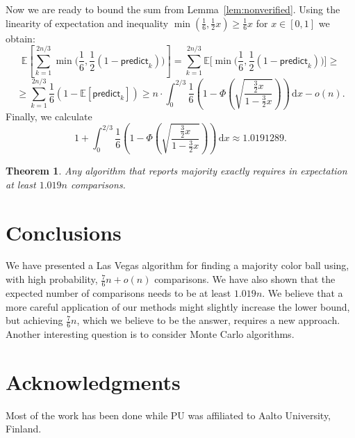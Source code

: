 \documentclass{article}[11pt,a4paper]
\newtheorem{theorem}[definition]{Theorem}
\newcommand{\predict}{\mathsf{predict}}
\newcommand{\E}{\mathbb{E}}
\begin{document}
Now we are ready to bound the sum from Lemma~\ref{lem:nonverified}. Using the linearity
of expectation and inequality $\min(\frac{1}{6},\frac{1}{2}x) \geq \frac{1}{6}x$ for $x\in[0,1]$ we obtain:
\[ \E\left[\sum_{k=1}^{2n/3} \min\biggl(\frac16,\frac12(1-\predict_k)\biggr)\right] = \sum_{k=1}^{2n/3} \E\biggr[\min\biggl(\frac16,\frac12(1-\predict_k)\biggr)\biggr] \ge \]
\[ \ge \sum_{k=1}^{2n/3} \frac16 (1-\E[\predict_k]) \ge  n\cdot \int_{0}^{2/3} \! \frac16\left(1-\Phi\left(\sqrt{\frac{\frac32x}{1-\frac32x}}\right)\right) \, \mathrm{d}x - o(n).\]
Finally, we calculate \[1 + \int_{0}^{2/3} \! \frac16\left(1-\Phi\left(\sqrt{\frac{\frac32x}{1-\frac32x}}\right)\right) \, \mathrm{d}x \approx 1.0191289.\]

\begin{theorem}
Any algorithm that reports majority exactly requires in expectation at least $1.019n$ comparisons.
\end{theorem}

\section{Conclusions}
We have presented a Las Vegas algorithm for finding a majority color ball using, with high probability,
$\frac{7}{6}n+o(n)$ comparisons. We have also shown that the expected number of comparisons
needs to be at least $1.019n$. We believe that a more careful application of our methods might
slightly increase the lower bound, but achieving $\frac{7}{6}n$, which we believe to be the answer, requires
a new approach. Another interesting question is to consider Monte Carlo algorithms.

\section*{Acknowledgments}
Most of the work has been done while PU was affiliated to Aalto University, Finland.




\end{document}
